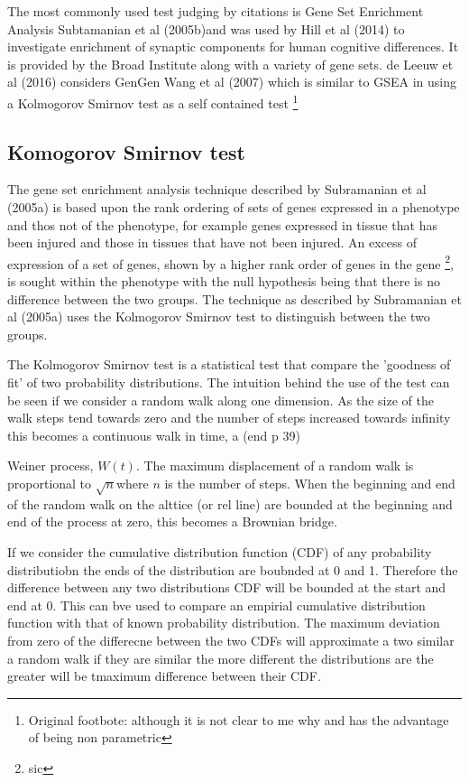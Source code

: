 The most commonly used test judging by citations is Gene Set Enrichment Analysis Subtamanian et al (2005b)and was used by Hill et al (2014) to investigate enrichment of synaptic components for human cognitive differences. It is provided by the Broad Institute along with a variety of gene sets. de Leeuw et al (2016) considers GenGen Wang et al (2007) which is similar to GSEA in using a Kolmogorov Smirnov test as a self contained test \footnote{Original footbote: although it is not clear to me why and has the advantage of being non parametric}

\subsection{Komogorov Smirnov test}

The gene set enrichment analysis technique described by Subramanian et al (2005a) is based upon the rank ordering of sets of genes expressed in a phenotype and thos not of the phenotype, for example genes expressed in tissue that has been injured and those in tissues that have not been injured. An excess of expression of a set of genes, shown by a higher rank order of genes in the gene \footnote{sic}, is sought within the phenotype with the null hypothesis being that there is no difference between the two groups. The technique as described by Subramanian et al (2005a) uses the Kolmogorov Smirnov test to distinguish between the two groups. 

The Kolmogorov Smirnov test is a statistical test that compare the 'goodness of fit' of two probability distributions. The intuition behind the use of the test can be seen if we consider a random walk along one dimension. As the size of the walk steps tend towards zero and the number of steps increased towards infinity this becomes a continuous walk in time, a (end p 39)

Weiner process, $W(t)$. The maximum displacement of a random walk is proportional to $\sqrt{n}$where $n$ is the number of steps. When the beginning and end of the random walk on the alttice (or rel line) are bounded at the beginning and end of the process at zero, this becomes a Brownian bridge.

If we consider the cumulative distribution function (CDF) of any probability distributiobn the ends of the distribution are boubnded at 0 and 1. Therefore the difference between any two distributions CDF will be bounded at the start and end at 0. This can bve used to compare an empirial cumulative distribution function with that of known probability distribution. The maximum deviation from zero of the differecne between the two CDFs will approximate a two similar a random walk if they are similar the more different the distributions are the greater will be tmaximum difference between their CDF.

